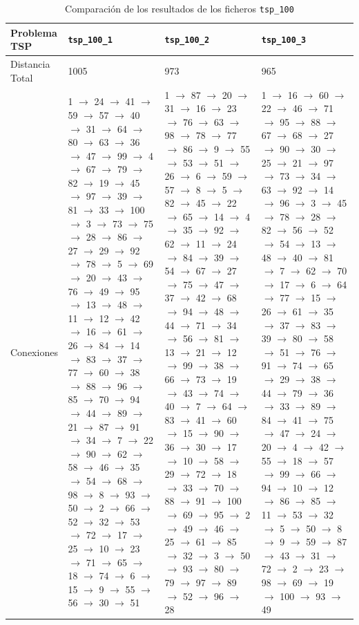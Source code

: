 \documentclass[a4paper,11pt]{article}
\begin{document}
\begin{table}[!htbp]
\label{results_tsp_100}
\centering
\begin{tabularx}{\textwidth}{|p{2cm}|X|X|X|}
\hline
Problema TSP    & \texttt{tsp\_100\_1}  & \texttt{tsp\_100\_2}  & \texttt{tsp\_100\_3}  \\ \hline
Distancia Total & 1005   & 973   & 965	\\ \hline
Conexiones	& 1 $\to$ 24 $\to$ 41 $\to$ 59 $\to$ 57 $\to$ 40 $\to$ 31 $\to$ 64 $\to$ 80 $\to$ 63 $\to$ 36 $\to$ 47 $\to$ 99 $\to$ 4 $\to$ 67 $\to$ 79 $\to$ 82 $\to$ 19 $\to$ 45 $\to$ 97 $\to$ 39 $\to$ 81 $\to$ 33 $\to$ 100 $\to$ 3 $\to$ 73 $\to$ 75 $\to$ 28 $\to$ 86 $\to$ 27 $\to$ 29 $\to$ 92 $\to$ 78 $\to$ 5 $\to$ 69 $\to$ 20 $\to$ 43 $\to$ 76 $\to$ 49 $\to$ 95 $\to$ 13 $\to$ 48 $\to$ 11 $\to$ 12 $\to$ 42 $\to$ 16 $\to$ 61 $\to$ 26 $\to$ 84 $\to$ 14 $\to$ 83 $\to$ 37 $\to$ 77 $\to$ 60 $\to$ 38 $\to$ 88 $\to$ 96 $\to$ 85 $\to$ 70 $\to$ 94 $\to$ 44 $\to$ 89 $\to$ 21 $\to$ 87 $\to$ 91 $\to$ 34 $\to$ 7 $\to$ 22 $\to$ 90 $\to$ 62 $\to$ 58 $\to$ 46 $\to$ 35 $\to$ 54 $\to$ 68 $\to$ 98 $\to$ 8 $\to$ 93 $\to$ 50 $\to$ 2 $\to$ 66 $\to$ 52 $\to$ 32 $\to$ 53 $\to$ 72 $\to$ 17 $\to$ 25 $\to$ 10 $\to$ 23 $\to$ 71 $\to$ 65 $\to$ 18 $\to$ 74 $\to$ 6 $\to$ 15 $\to$ 9 $\to$ 55 $\to$ 56 $\to$ 30 $\to$ 51	& 1 $\to$ 87 $\to$ 20 $\to$ 31 $\to$ 16 $\to$ 23 $\to$ 76 $\to$ 63 $\to$ 98 $\to$ 78 $\to$ 77 $\to$ 86 $\to$ 9 $\to$ 55 $\to$ 53 $\to$ 51 $\to$ 26 $\to$ 6 $\to$ 59 $\to$ 57 $\to$ 8 $\to$ 5 $\to$ 82 $\to$ 45 $\to$ 22 $\to$ 65 $\to$ 14 $\to$ 4 $\to$ 35 $\to$ 92 $\to$ 62 $\to$ 11 $\to$ 24 $\to$ 84 $\to$ 39 $\to$ 54 $\to$ 67 $\to$ 27 $\to$ 75 $\to$ 47 $\to$ 37 $\to$ 42 $\to$ 68 $\to$ 94 $\to$ 48 $\to$ 44 $\to$ 71 $\to$ 34 $\to$ 56 $\to$ 81 $\to$ 13 $\to$ 21 $\to$ 12 $\to$ 99 $\to$ 38 $\to$ 66 $\to$ 73 $\to$ 19 $\to$ 43 $\to$ 74 $\to$ 40 $\to$ 7 $\to$ 64 $\to$ 83 $\to$ 41 $\to$ 60 $\to$ 15 $\to$ 90 $\to$ 36 $\to$ 30 $\to$ 17 $\to$ 10 $\to$ 58 $\to$ 29 $\to$ 72 $\to$ 18 $\to$ 33 $\to$ 70 $\to$ 88 $\to$ 91 $\to$ 100 $\to$ 69 $\to$ 95 $\to$ 2 $\to$ 49 $\to$ 46 $\to$ 25 $\to$ 61 $\to$ 85 $\to$ 32 $\to$ 3 $\to$ 50 $\to$ 93 $\to$ 80 $\to$ 79 $\to$ 97 $\to$ 89 $\to$ 52 $\to$ 96 $\to$ 28	& 1 $\to$ 16 $\to$ 60 $\to$ 22 $\to$ 46 $\to$ 71 $\to$ 95 $\to$ 88 $\to$ 67 $\to$ 68 $\to$ 27 $\to$ 90 $\to$ 30 $\to$ 25 $\to$ 21 $\to$ 97 $\to$ 73 $\to$ 34 $\to$ 63 $\to$ 92 $\to$ 14 $\to$ 96 $\to$ 3 $\to$ 45 $\to$ 78 $\to$ 28 $\to$ 82 $\to$ 56 $\to$ 52 $\to$ 54 $\to$ 13 $\to$ 48 $\to$ 40 $\to$ 81 $\to$ 7 $\to$ 62 $\to$ 70 $\to$ 17 $\to$ 6 $\to$ 64 $\to$ 77 $\to$ 15 $\to$ 26 $\to$ 61 $\to$ 35 $\to$ 37 $\to$ 83 $\to$ 39 $\to$ 80 $\to$ 58 $\to$ 51 $\to$ 76 $\to$ 91 $\to$ 74 $\to$ 65 $\to$ 29 $\to$ 38 $\to$ 44 $\to$ 79 $\to$ 36 $\to$ 33 $\to$ 89 $\to$ 84 $\to$ 41 $\to$ 75 $\to$ 47 $\to$ 24 $\to$ 20 $\to$ 4 $\to$ 42 $\to$ 55 $\to$ 18 $\to$ 57 $\to$ 99 $\to$ 66 $\to$ 94 $\to$ 10 $\to$ 12 $\to$ 86 $\to$ 85 $\to$ 11 $\to$ 53 $\to$ 32 $\to$ 5 $\to$ 50 $\to$ 8 $\to$ 9 $\to$ 59 $\to$ 87 $\to$ 43 $\to$ 31 $\to$ 72 $\to$ 2 $\to$ 23 $\to$ 98 $\to$ 69 $\to$ 19 $\to$ 100 $\to$ 93 $\to$ 49	\\ \hline
\end{tabularx}
\caption{Comparación de los resultados de los ficheros \texttt{tsp\_100}}
\end{table}
\end{document}
